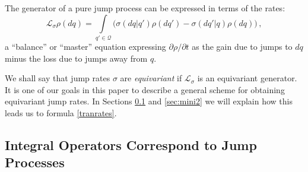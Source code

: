 \documentclass[12pt]{article}
\newcommand{\1}{\mathbf{1}} %
\newcommand{\conf}{\mathcal{Q}} %
\newcommand{\generator}{\mathscr{L}} %
\begin{document}
The generator of a pure jump process can be expressed in terms of the
rates:
\begin{equation}\label{continuity3}
   \generator_\sigma \rho(dq) = \int\limits_{q'\in\conf}  \Big(
   \sigma(dq|q') \rho(dq') - \sigma(dq'|q) \rho(dq) \Big)\,,
\end{equation}
a ``balance'' or ``master'' equation expressing $\partial
\rho/\partial t$ as the gain due to jumps to $dq$ minus the loss due
to jumps away from $q$.

We shall say that jump rates $\sigma$ are \emph{equivariant} if
$\generator_\sigma$ is an equivariant generator.  It is one of our goals
in
this paper to describe  a general scheme for obtaining equivariant jump
rates. In Sections \ref{sec:mini1} and \ref{sec:mini2} we will explain 
how
this leads us to formula \eqref{tranrates}.


\subsection{Integral Operators Correspond to Jump Processes}
\label{sec:mini1}
\end{document}
